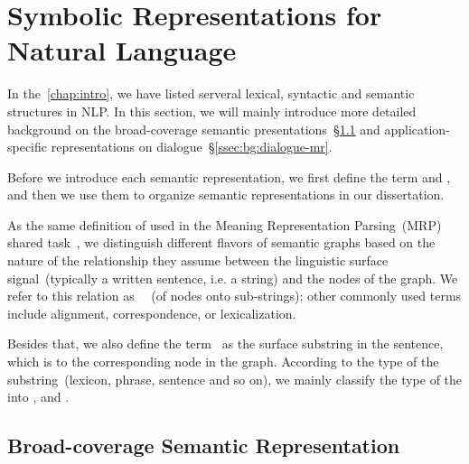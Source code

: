 \section{Symbolic Representations for Natural Language}
\label{sec:bg:symbolic}
In the~\autoref{chap:intro}, we have listed serveral lexical,
syntactic and semantic structures in NLP. In this section, we will
mainly introduce more detailed background on the broad-coverage
semantic presentations~\S\ref{ssec:bg:broad-mr} and
application-specific representations on
dialogue~\S\ref{ssec:bg:dialogue-mr}.

Before we introduce each semantic representation, we first define the
term  and , and then we use them to organize
semantic representations in our dissertation.

 As the same definition of  used in the
Meaning Representation Parsing~(MRP) shared
task~\citep{Oep:Abe:Haj:19}, we distinguish different flavors of
semantic graphs based on the nature of the relationship they assume
between the linguistic surface signal~(typically a written sentence,
i.e. a string) and the nodes of the graph. We refer to this relation
as ~~(of nodes onto sub-strings); other commonly used
terms include alignment, correspondence, or lexicalization.

 Besides that, we also define the term~ as
the surface substring in the sentence, which is  to the
corresponding node in the graph. According to the type of the
substring~(lexicon, phrase, sentence and so on), we mainly classify
the type of the  into ,
 and
.


\subsection{Broad-coverage Semantic Representation}
\label{ssec:bg:broad-mr}

